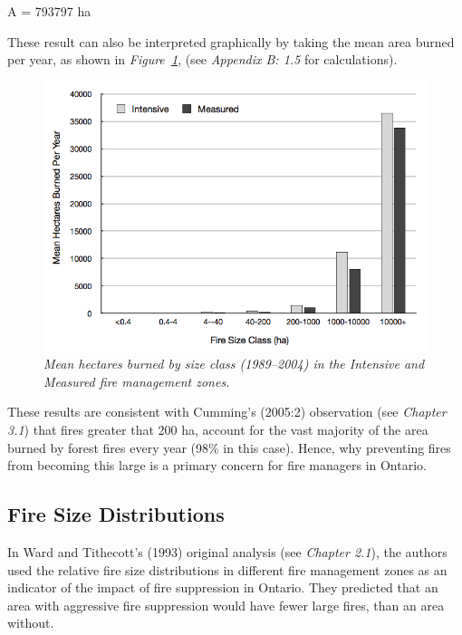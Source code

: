 \begin{spacing}{1.5}
\noindent A = 793797 ha \\

\clearpage

\noindent These result can also be interpreted graphically by taking the mean area burned per year, as shown in \emph{Figure~\ref{fig9}}, (see \emph{Appendix B: 1.5} for calculations). \\

\begin{figure}[h!]
  \centering
    \includegraphics[width=1\textwidth]{media/fig9}
      \caption[Mean hectares burned by size class]{\emph{Mean hectares burned by size class (1989--2004) in the Intensive and Measured fire management zones.}}
        \label{fig9}
\end{figure}

\noindent These results are consistent with Cumming's (2005:2) observation (see \emph{Chapter 3.1}) that fires greater that 200 ha, account for the vast majority  of the area burned by forest fires every year (98\% in this case). Hence, why preventing fires from becoming this large is a primary concern for fire managers in Ontario.

\subsection{Fire Size Distributions}

In Ward and Tithecott's (1993) original analysis (see \emph{Chapter 2.1}), the authors used the relative fire size distributions in different fire management zones as an indicator of the impact of fire suppression in Ontario. They predicted that an area with aggressive fire suppression would have fewer large fires, than an area without. \\


\end{spacing}
